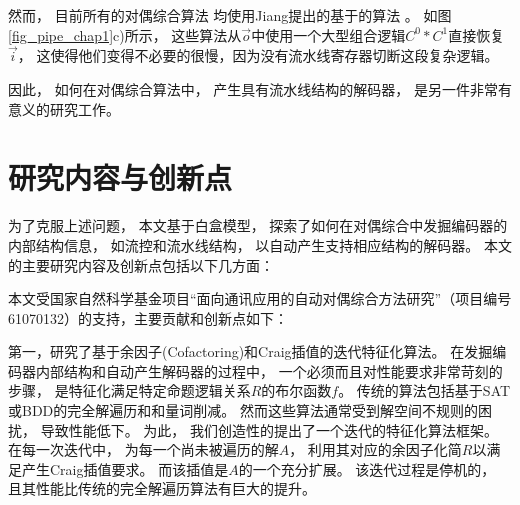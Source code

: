 然而，
目前所有的对偶综合算法
均使用Jiang提出的基于的算法 。
如图\ref{fig_pipe_chap1}c)所示，
这些算法从$\vec{o}$中使用一个大型组合逻辑$C^0*C^1$直接恢复$\vec{i}$，
这使得他们变得不必要的很慢，因为没有流水线寄存器切断这段复杂逻辑。

因此，
如何在对偶综合算法中，
产生具有流水线结构的解码器，
是另一件非常有意义的研究工作。


%
%
%
%
%
%



\section{研究内容与创新点}\label{sec_contest_innov}
为了克服上述问题，
本文基于白盒模型，
探索了如何在对偶综合中发掘编码器的内部结构信息，
如流控和流水线结构，
以自动产生支持相应结构的解码器。
本文的主要研究内容及创新点包括以下几方面：

本文受国家自然科学基金项目“面向通讯应用的自动对偶综合方法研究”（项目编号61070132）的支持，主要贡献和创新点如下：



第一，研究了基于余因子(Cofactoring)和Craig插值的迭代特征化算法。
在发掘编码器内部结构和自动产生解码器的过程中，
一个必须而且对性能要求非常苛刻的步骤，
是特征化满足特定命题逻辑关系$R$的布尔函数$f$。
传统的算法包括基于SAT或BDD的完全解遍历和和量词削减。
然而这些算法通常受到解空间不规则的困扰，
导致性能低下。
为此，
我们创造性的提出了一个迭代的特征化算法框架。
在每一次迭代中，
为每一个尚未被遍历的解$A$，
利用其对应的余因子化简$R$以满足产生Craig插值要求。
而该插值是$A$的一个充分扩展。
该迭代过程是停机的，
且其性能比传统的完全解遍历算法有巨大的提升。

